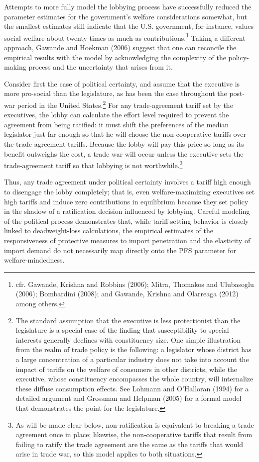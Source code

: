 \documentclass[10pt]{article}
\begin{document}
Attempts to more fully model the lobbying process have successfully reduced the parameter estimates for the government's welfare considerations somewhat, but the smallest estimates still indicate that the U.S. government, for instance, values social welfare about twenty times as much as contributions.\footnote{cfr. Gawande, Krishna and Robbins (2006); Mitra, Thomakos and Ulubasoglu (2006); Bombardini (2008); and Gawande, Krishna and Olarreaga (2012) among others.} Taking a different approach, Gawande and Hoekman (2006) suggest that one can reconcile the empirical results with the model by acknowledging the complexity of the policy-making process and the uncertainty that arises from it.

Consider first the case of political certainty, and assume that the executive is more pro-social than the legislature, as has been the case throughout the post-war period in the United States.\footnote{The standard assumption that the executive is less protectionist than the legislature is a special case of the finding that susceptibility to special interests generally declines with constituency size. One simple illustration from the realm of trade policy is the following: a legislator whose district has a large concentration of a particular industry does not take into account the impact of tariffs on the welfare of consumers in other districts, while the executive, whose constituency encompasses the whole country, will internalize these diffuse consumption effects. See Lohmann and O'Halloran (1994) for a detailed argument and Grossman and Helpman (2005) for a formal model that demonstrates the point for the legislature.\label{fn:ga_l_e}} For any trade-agreement tariff set by the executives, the lobby can calculate the effort level required to prevent the agreement from being ratified: it must shift the preferences of the median legislator just far enough so that he will choose the non-cooperative tariffs over the trade agreement tariffs. Because the lobby will pay this price so long as its benefit outweighs the cost, a trade war will occur unless the executive sets the trade-agreement tariff so that lobbying is not worthwhile.\footnote{As will be made clear below, non-ratification is equivalent to breaking a trade agreement once in place; likewise, the non-cooperative tariffs that result from failing to ratify the trade agreement are the same as the tariffs that would arise in trade war, so this model applies to both situations.}

Thus, any trade agreement under political certainty involves a tariff high enough to disengage the lobby completely; that is, even welfare-maximizing executives set high tariffs and induce zero contributions in equilibrium because they set policy in the shadow of a ratification decision influenced by lobbying. Careful modeling of the political process demonstrates that, while tariff-setting behavior is closely linked to deadweight-loss calculations, the empirical estimates of the responsiveness of protective measures to import penetration and the elasticity of import demand do not necessarily map directly onto the PFS parameter for welfare-mindedness.
\end{document}
